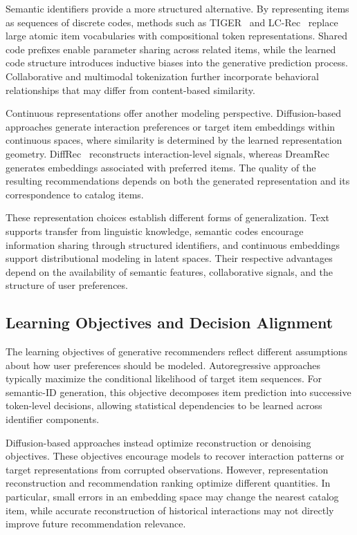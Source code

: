 \documentclass[sigconf,nonacm]{acmart}
\begin{document}
Semantic identifiers provide a more structured
alternative. By representing items as sequences of
discrete codes, methods such as TIGER~\cite{tiger}
and LC-Rec~\cite{lcrec} replace large atomic item
vocabularies with compositional token representations.
Shared code prefixes enable parameter sharing across
related items, while the learned code structure
introduces inductive biases into the generative
prediction process. Collaborative and multimodal
tokenization further incorporate behavioral relationships
that may differ from content-based similarity.

Continuous representations offer another modeling
perspective. Diffusion-based approaches generate
interaction preferences or target item embeddings
within continuous spaces, where similarity is
determined by the learned representation geometry.
DiffRec~\cite{diffrec} reconstructs interaction-level
signals, whereas DreamRec~\cite{dreamrec} generates
embeddings associated with preferred items.
The quality of the resulting recommendations
depends on both the generated representation
and its correspondence to catalog items.

These representation choices establish different
forms of generalization. Text supports transfer
from linguistic knowledge, semantic codes
encourage information sharing through structured
identifiers, and continuous embeddings support
distributional modeling in latent spaces.
Their respective advantages depend on the
availability of semantic features, collaborative
signals, and the structure of user preferences.

\subsection{Learning Objectives and Decision Alignment}

The learning objectives of generative recommenders
reflect different assumptions about how user
preferences should be modeled. Autoregressive
approaches typically maximize the conditional
likelihood of target item sequences. For semantic-ID
generation, this objective decomposes item prediction
into successive token-level decisions, allowing
statistical dependencies to be learned across
identifier components.

Diffusion-based approaches instead optimize
reconstruction or denoising objectives. These
objectives encourage models to recover interaction
patterns or target representations from corrupted
observations. However, representation reconstruction
and recommendation ranking optimize different
quantities. In particular, small errors in an
embedding space may change the nearest catalog
item, while accurate reconstruction of historical
interactions may not directly improve future
recommendation relevance.
\end{document}

